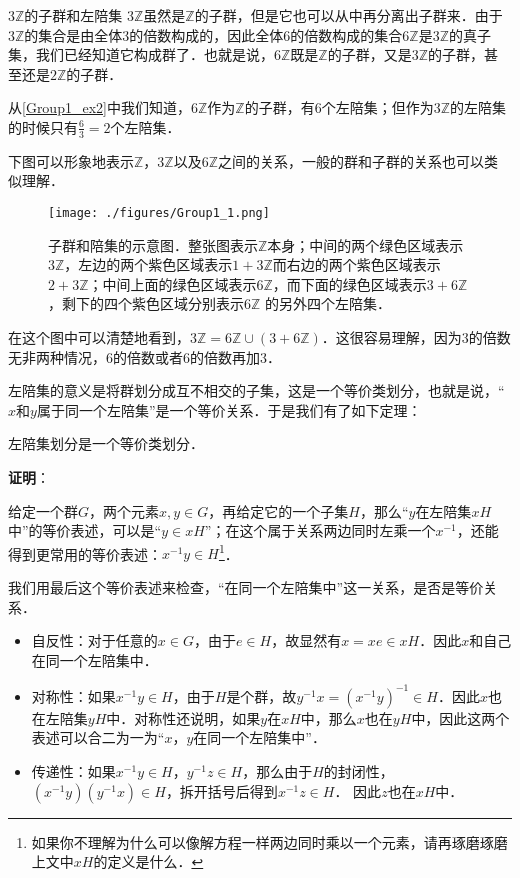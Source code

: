 \begin{example}{$3\mathbb{Z}$的子群和左陪集}\label{Group1_ex3}
$3\mathbb{Z}$虽然是$\mathbb{Z}$的子群，但是它也可以从中再分离出子群来．由于$3\mathbb{Z}$的集合是由全体$3$的倍数构成的，因此全体$6$的倍数构成的集合$6\mathbb{Z}$是$3\mathbb{Z}$的真子集，我们已经知道它构成群了．也就是说，$6\mathbb{Z}$既是$\mathbb{Z}$的子群，又是$3\mathbb{Z}$的子群，甚至还是$2\mathbb{Z}$的子群．

从\autoref{Group1_ex2}中我们知道，$6\mathbb{Z}$作为$\mathbb{Z}$的子群，有$6$个左陪集；但作为$3\mathbb{Z}$的左陪集的时候只有$\frac{6}{3}=2$个左陪集．

下图可以形象地表示$\mathbb{Z}$，$3\mathbb{Z}$以及$6\mathbb{Z}$之间的关系，一般的群和子群的关系也可以类似理解．

\begin{figure}[ht]
\centering
\texttt{[image: ./figures/Group1\_1.png]}
\caption{子群和陪集的示意图．整张图表示$\mathbb{Z}$本身；中间的两个绿色区域表示$3\mathbb{Z}$，左边的两个紫色区域表示$1+3\mathbb{Z}$而右边的两个紫色区域表示$2+3\mathbb{Z}$；中间上面的绿色区域表示$6\mathbb{Z}$，而下面的绿色区域表示$3+6\mathbb{Z}$，剩下的四个紫色区域分别表示$6\mathbb{Z}$ 的另外四个左陪集．} \label{Group1_fig1}
\end{figure}

在这个图中可以清楚地看到，$3\mathbb{Z}=6\mathbb{Z}\cup(3+6\mathbb{Z})$．这很容易理解，因为$3$的倍数无非两种情况，$6$的倍数或者$6$的倍数再加$3$．

\end{example}

左陪集的意义是将群划分成互不相交的子集，这是一个等价类划分，也就是说，“$x$和$y$属于同一个左陪集”是一个等价关系．于是我们有了如下定理： 

\begin{theorem}{}\label{Group1_the1}

左陪集划分是一个等价类划分．

\end{theorem}

\textbf{证明}：

给定一个群$G$，两个元素$x, y\in G$，再给定它的一个子集$H$，那么“$y$在左陪集$xH$中”的等价表述，可以是“$y\in xH$”；在这个属于关系两边同时左乘一个$x^{-1}$，还能得到更常用的等价表述：$x^{-1}y\in H$\footnote{如果你不理解为什么可以像解方程一样两边同时乘以一个元素，请再琢磨琢磨上文中$xH$的定义是什么．}．

我们用最后这个等价表述来检查，“在同一个左陪集中”这一关系，是否是等价关系．
\begin{itemize}
\item 自反性：对于任意的$x\in G$，由于$e\in H$，故显然有$x=xe\in xH$．因此$x$和自己在同一个左陪集中．
\item 对称性：如果$x^{-1}y\in H$，由于$H$是个群，故$y^{-1}x=(x^{-1}y)^{-1}\in H$．因此$x$也在左陪集$yH$中．对称性还说明，如果$y$在$xH$中，那么$x$也在$yH$中，因此这两个表述可以合二为一为“$x$，$y$在同一个左陪集中”．
\item 传递性：如果$x^{-1}y\in H$，$y^{-1}z\in H$，那么由于$H$的封闭性，$(x^{-1}y)(y^{-1}x)\in H$，拆开括号后得到$x^{-1}z\in H$． 因此$z$也在$xH$中．
\end{itemize}

